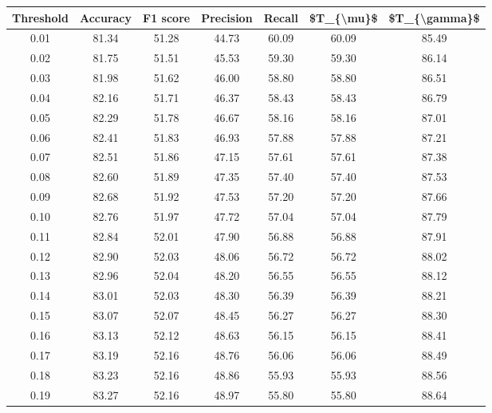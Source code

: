 \begin{tabular}{|c|c|c|c|c|c|c|}
\hline
 Threshold &  Accuracy &  F1 score &  Precision &  Recall &  \$T\_\{\textbackslash mu\}\$ &  \$T\_\{\textbackslash gamma\}\$ \\
\hline
      0.01 &     81.34 &     51.28 &      44.73 &   60.09 &      60.09 &         85.49 \\
      0.02 &     81.75 &     51.51 &      45.53 &   59.30 &      59.30 &         86.14 \\
      0.03 &     81.98 &     51.62 &      46.00 &   58.80 &      58.80 &         86.51 \\
      0.04 &     82.16 &     51.71 &      46.37 &   58.43 &      58.43 &         86.79 \\
      0.05 &     82.29 &     51.78 &      46.67 &   58.16 &      58.16 &         87.01 \\
      0.06 &     82.41 &     51.83 &      46.93 &   57.88 &      57.88 &         87.21 \\
      0.07 &     82.51 &     51.86 &      47.15 &   57.61 &      57.61 &         87.38 \\
      0.08 &     82.60 &     51.89 &      47.35 &   57.40 &      57.40 &         87.53 \\
      0.09 &     82.68 &     51.92 &      47.53 &   57.20 &      57.20 &         87.66 \\
      0.10 &     82.76 &     51.97 &      47.72 &   57.04 &      57.04 &         87.79 \\
      0.11 &     82.84 &     52.01 &      47.90 &   56.88 &      56.88 &         87.91 \\
      0.12 &     82.90 &     52.03 &      48.06 &   56.72 &      56.72 &         88.02 \\
      0.13 &     82.96 &     52.04 &      48.20 &   56.55 &      56.55 &         88.12 \\
      0.14 &     83.01 &     52.03 &      48.30 &   56.39 &      56.39 &         88.21 \\
      0.15 &     83.07 &     52.07 &      48.45 &   56.27 &      56.27 &         88.30 \\
      0.16 &     83.13 &     52.12 &      48.63 &   56.15 &      56.15 &         88.41 \\
      0.17 &     83.19 &     52.16 &      48.76 &   56.06 &      56.06 &         88.49 \\
      0.18 &     83.23 &     52.16 &      48.86 &   55.93 &      55.93 &         88.56 \\
      0.19 &     83.27 &     52.16 &      48.97 &   55.80 &      55.80 &         88.64 \\

\end{tabular}
